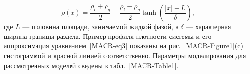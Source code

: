 \begin{equation}
    \rho(x)=\frac{\rho_{l}+\rho_{g}}{2}-\frac{\rho_{l}-\rho_{g}}{2} \tanh \left(\frac{|x|-L}{\delta}\right),
    \label{MACR-eq3}
\end{equation}
где $L$ — половина площади, занимаемой жидкой фазой, а $\delta$ — характерная ширина границы раздела.
Пример профиля плотности системы и его аппроксимация уравнением~\eqref{MACR-eq3} показаны на рис.~\ref{MACR-Figure1}(c) гистограммой и красной линией соответственно.
Параметры моделирования для рассмотренных моделей сведены в табл.~\ref{MACR-Table1}.


